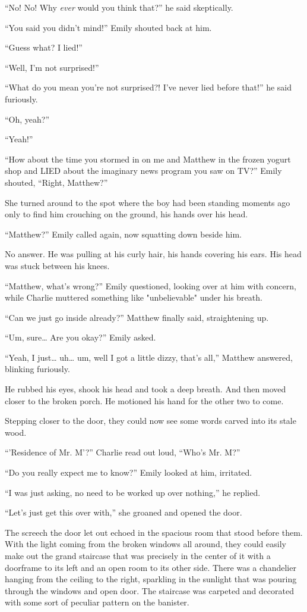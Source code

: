 “No! No! Why \textit{ever} would you think that?” he said skeptically.

“You said you didn't mind!” Emily shouted back at him.

“Guess what? I lied!”

“Well, I'm not surprised!”

“What do you mean you're not surprised?! I've never lied before that!” he said furiously.

“Oh, yeah?”

“Yeah!”

“How about the time you stormed in on me and Matthew in the frozen yogurt shop and LIED about the imaginary news program you saw on TV?” Emily shouted, “Right, Matthew?”

She turned around to the spot where the boy had been standing moments ago only to find him crouching on the ground, his hands over his head.

“Matthew?” Emily called again, now squatting down beside him.

No answer. He was pulling at his curly hair, his hands covering his ears. His head was stuck between his knees.

“Matthew, what's wrong?” Emily questioned, looking over at him with concern, while Charlie muttered something like "unbelievable" under his breath.

“Can we just go inside already?” Matthew finally said, straightening up.

“Um, sure… Are you okay?” Emily asked.

“Yeah, I just… uh… um, well I got a little dizzy, that's all,” Matthew answered, blinking furiously.

He rubbed his eyes, shook his head and took a deep breath. And then moved closer to the broken porch. He motioned his hand for the other two to come.

Stepping closer to the door, they could now see some words carved into its stale wood.

“'Residence of Mr. M'?” Charlie read out loud, “Who's Mr. M?”

“Do you really expect me to know?” Emily looked at him, irritated.

“I was just asking, no need to be worked up over nothing,” he replied.

“Let's just get this over with,” she groaned and opened the door.

The screech the door let out echoed in the spacious room that stood before them. With the light coming from the broken windows all around, they could easily make out the grand staircase that was precisely in the center of it with a doorframe to its left and an open room to its other side. There was a chandelier hanging from the ceiling to the right, sparkling in the sunlight that was pouring through the windows and open door. The staircase was carpeted and decorated with some sort of peculiar pattern on the banister.

